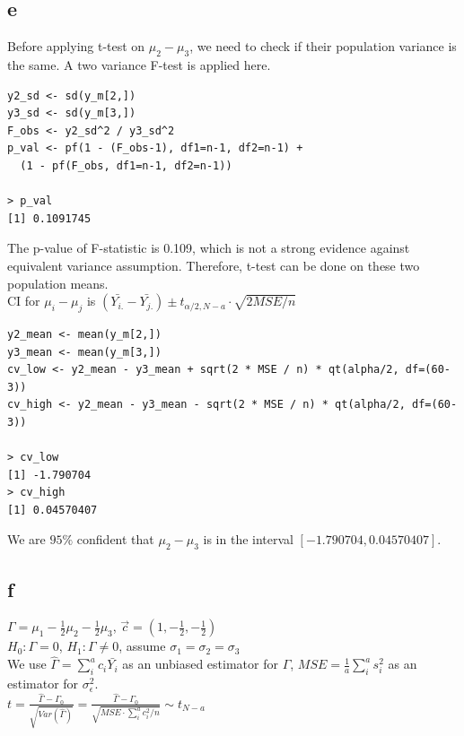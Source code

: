 \documentclass[11pt,letterpaper]{article}
\let\hat\widehat
\begin{document}
\subsection*{e}
\noindent Before applying t-test on $\mu_2 - \mu_3$, we need to check if their population variance is the same. A two variance F-test is applied here. 
\begin{verbatim}
y2_sd <- sd(y_m[2,])
y3_sd <- sd(y_m[3,])
F_obs <- y2_sd^2 / y3_sd^2
p_val <- pf(1 - (F_obs-1), df1=n-1, df2=n-1) +
  (1 - pf(F_obs, df1=n-1, df2=n-1))
  
> p_val
[1] 0.1091745
\end{verbatim}
\noindent The p-value of F-statistic is 0.109, which is not a strong evidence against equivalent variance assumption. Therefore, t-test can be done on these two population means. \\

\noindent CI for $\mu_i - \mu_j$ is $(\bar{Y_{i.}} - \bar{Y_{j.}}) \pm t_{\alpha / 2, N-a} \cdot \sqrt{2MSE / n}$
\begin{verbatim}
y2_mean <- mean(y_m[2,])
y3_mean <- mean(y_m[3,])
cv_low <- y2_mean - y3_mean + sqrt(2 * MSE / n) * qt(alpha/2, df=(60-3))
cv_high <- y2_mean - y3_mean - sqrt(2 * MSE / n) * qt(alpha/2, df=(60-3))

> cv_low
[1] -1.790704
> cv_high
[1] 0.04570407
\end{verbatim}
We are $95 \%$ confident that $\mu_2 - \mu_3$ is in the interval $[-1.790704, 0.04570407]$.

\subsection*{f}
$\Gamma = \mu_1 - \frac{1}{2} \mu_2 - \frac{1}{2} \mu_3$, $\vec{c} = (1, -\frac{1}{2}, -\frac{1}{2})$ \\

\noindent $H_0: \Gamma = 0$, $H_1: \Gamma \neq 0$, assume $\sigma_1 = \sigma_2 = \sigma_3$\\

\noindent We use $\hat{\Gamma} = \sum_i^a c_i \bar{Y_i}$ as an unbiased estimator for $\Gamma$, $MSE = \frac{1}{a} \sum_i^a s_i^2$ as an estimator for $\sigma_{\epsilon}^2$. \\

\noindent $t = \frac{\hat{\Gamma} - \Gamma_0}{\sqrt{Var(\hat{\Gamma})}} = \frac{\hat{\Gamma} - \Gamma_0}{\sqrt{MSE \cdot \sum_i^a c_i^2 / n}} \sim t_{N-a}$ \\
\end{document}
